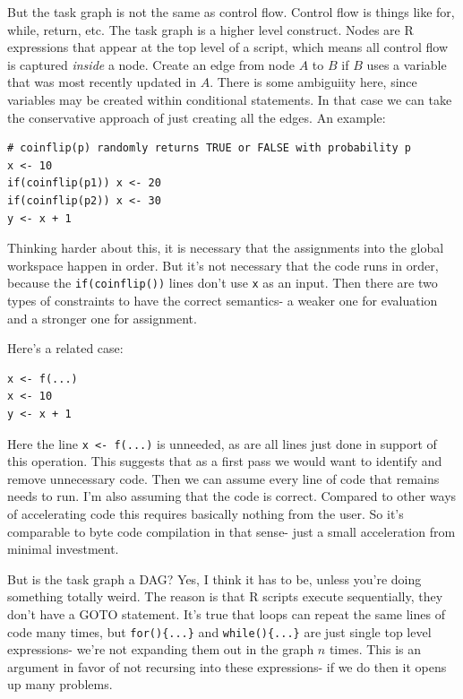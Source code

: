 \documentclass[12pt]{article}
\begin{document}
But the task graph is not the same as control flow. Control flow is things
like for, while, return, etc. The task graph is a higher level construct. 
Nodes are R expressions that appear at the top level of a script, which
means all control flow is captured \emph{inside} a node. Create an edge
from node $A$ to $B$ if $B$ uses a variable that was most recently updated
in $A$. There is some ambiguiity here, since variables may be created
within conditional statements. In that case we can take the conservative
approach of just creating all the edges. An example:

\begin{verbatim}
# coinflip(p) randomly returns TRUE or FALSE with probability p
x <- 10
if(coinflip(p1)) x <- 20
if(coinflip(p2)) x <- 30
y <- x + 1
\end{verbatim}

Thinking harder about this, it is necessary that the assignments into the
global workspace happen in order. But it's not necessary that the code runs
in order, because the \texttt{if(coinflip())} lines don't use \texttt{x} as
an input. Then there are two types of constraints to have the correct
semantics- a weaker one for evaluation and a stronger one for assignment. 

Here's a related case:

\begin{verbatim}
x <- f(...)
x <- 10
y <- x + 1
\end{verbatim}

Here the line \texttt{x <- f(...)} is unneeded, as are all lines just done
in support of this operation. This suggests that as a first pass we would
want to identify and remove unnecessary code. Then we can assume every
line of code that remains needs to run. I'm also assuming that the code is
correct. Compared to other ways of accelerating code this requires
basically nothing from the user. So it's comparable to byte code
compilation in that
sense- just a small acceleration from minimal investment.

But is the task graph a DAG? Yes, I think it has to be, unless you're doing
something totally weird.  The reason is that R scripts execute
sequentially, they don't have a GOTO statement. It's true that loops can
repeat the same lines of code many times, but \texttt{for()\{...\}} and 
\texttt{while()\{...\}} are just single top level expressions- we're not
expanding them out in the graph $n$ times. This is an argument in favor of
not recursing into these expressions- if we do then it opens up many
problems. 
\end{document}
